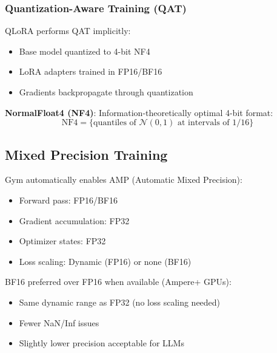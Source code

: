 \subsubsection{Quantization-Aware Training (QAT)}

QLoRA performs QAT implicitly:
\begin{itemize}
\item Base model quantized to 4-bit NF4
\item LoRA adapters trained in FP16/BF16
\item Gradients backpropagate through quantization
\end{itemize}

\textbf{NormalFloat4 (NF4)}: Information-theoretically optimal 4-bit format:
\begin{equation}
\text{NF4} = \{\text{quantiles of } \mathcal{N}(0,1) \text{ at intervals of } 1/16\}
\end{equation}

\subsection{Mixed Precision Training}

Gym automatically enables AMP (Automatic Mixed Precision):
\begin{itemize}
\item Forward pass: FP16/BF16
\item Gradient accumulation: FP32
\item Optimizer states: FP32
\item Loss scaling: Dynamic (FP16) or none (BF16)
\end{itemize}

BF16 preferred over FP16 when available (Ampere+ GPUs):
\begin{itemize}
\item Same dynamic range as FP32 (no loss scaling needed)
\item Fewer NaN/Inf issues
\item Slightly lower precision acceptable for LLMs
\end{itemize}

